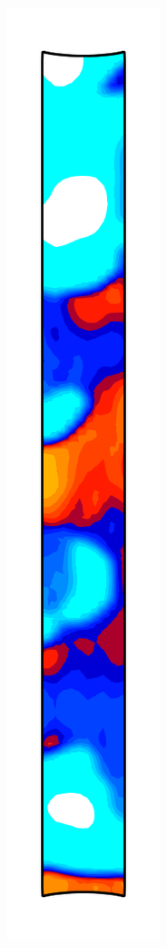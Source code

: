 \begin{figure}[!htb]
\begin{subfigure}{0.08\textwidth}
  \end{subfigure}
  \begin{subfigure}{0.08\textwidth}
    \centering
    \includegraphics[width=\textwidth]{Chapter5/figures/spallation/c_3}

\end{subfigure}
\end{figure}
